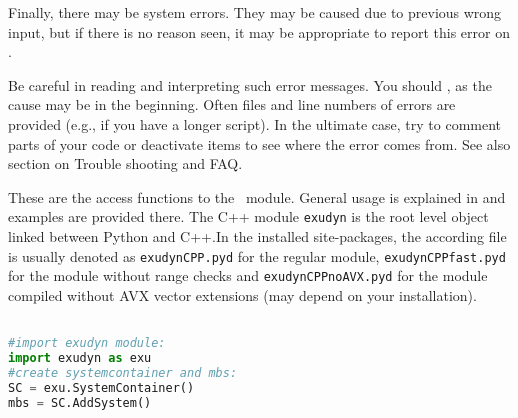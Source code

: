 Finally, there may be system errors. They may be caused due to previous wrong input, but if there is no reason seen, it may be appropriate to report this error on  .

Be careful in reading and interpreting such error messages. You should , as the cause may be in the beginning. Often files and line numbers of errors are provided (e.g., if you have a longer script). In the ultimate case, try to comment parts of your code or deactivate items to see where the error comes from. See also section on Trouble shooting and FAQ.

\mysubsection{\codeName}



These are the access functions to the \codeName\ module. General usage is explained in  and examples are provided there. The C++ module \texttt{exudyn} is the root level object linked between Python and C++.In the installed site-packages, the according file is usually denoted as \texttt{exudynCPP.pyd} for the regular module, \texttt{exudynCPPfast.pyd} for the module without range checks and \texttt{exudynCPPnoAVX.pyd} for the module compiled without AVX vector extensions (may depend on your installation).
\pythonstyle
\begin{lstlisting}[language=Python, firstnumber=1]

#import exudyn module:
import exudyn as exu
#create systemcontainer and mbs:
SC = exu.SystemContainer()
mbs = SC.AddSystem()
\end{lstlisting}

